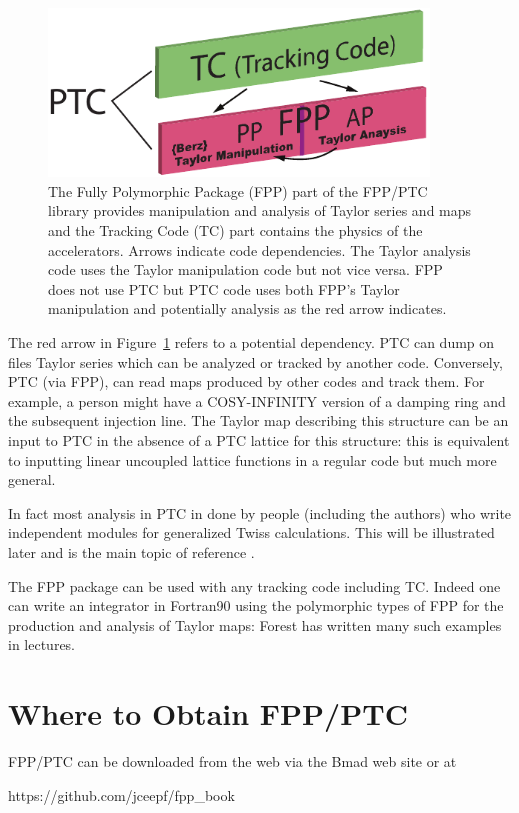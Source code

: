 \documentclass{hitec}     %
\newcommand{\Section}[1]{\section{#1}\vspace*{-1ex}}
\begin{document}
\begin{figure}[tb]
  \centering
  \includegraphics[width=0.9\textwidth]{ptcfppe.pdf}
  \caption{
The Fully Polymorphic Package (FPP) part of the FPP/PTC library provides manipulation and analysis
of Taylor series and maps and the Tracking Code (TC) part contains the physics of 
 the  accelerators. Arrows indicate code dependencies. The Taylor analysis code uses
the Taylor manipulation code but not vice versa. FPP does not use PTC but PTC code uses both FPP's
Taylor manipulation and potentially analysis as the red arrow indicates.
  }
  \label{f:ptc}
\end{figure}

The red arrow in Figure~\ref{f:ptc} refers to a potential dependency. PTC can dump on files Taylor series which can be analyzed or tracked by another code. Conversely, PTC (via FPP), can read maps produced by other codes and track them. For example, a person might have a COSY-INFINITY version of a damping ring and the subsequent injection line. The Taylor map describing this structure can be an input to PTC in the absence of a PTC lattice for this structure: this is equivalent to inputting linear uncoupled lattice functions in a regular code but much more general.


In fact most analysis in PTC in done by people (including the authors) who write independent modules for generalized Twiss calculations. This will be illustrated later and is the main topic of reference \cite{thenewbook}.


The FPP package can be used with any  tracking code including TC. Indeed one can  write an integrator in Fortran90 using the polymorphic types of FPP for the production and analysis of Taylor maps: Forest has written many such examples in lectures.


\Section{Where to Obtain FPP/PTC}
\label{s:obtain}

FPP/PTC can be downloaded from the web via the Bmad web site\cite{b:bmad} or at
\begin{code}
https://github.com/jceepf/fpp_book
\end{code}
\end{document}

